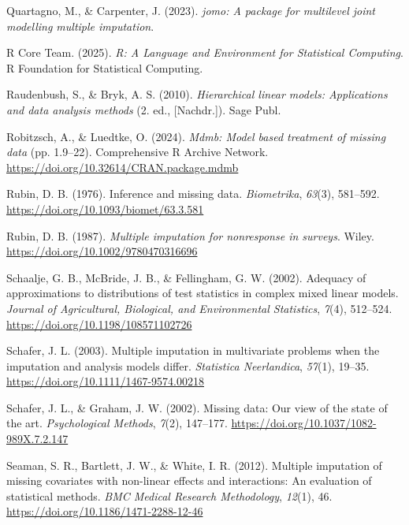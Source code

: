 \documentclass[
  letterpaper,
  11pt,
  english,
  singlespacing,
  headsepline,
  openany]{MastersDoctoralThesis}
\newlength{\cslhangindent}
\newenvironment{CSLReferences}[2] %
 {\begin{list}{}{%
  \setlength{\itemindent}{0pt}
  \setlength{\leftmargin}{0pt}
  \setlength{\parsep}{0pt}
  \ifodd #1
   \setlength{\leftmargin}{\cslhangindent}
   \setlength{\itemindent}{-1\cslhangindent}
  \fi
  \setlength{\itemsep}{#2\baselineskip}}}
 {\end{list}}
\begin{document}
\begin{CSLReferences}{1}{0}
Quartagno, M., \& Carpenter, J. (2023). \emph{{jomo}: A package for
multilevel joint modelling multiple imputation}.

R Core Team. (2025). \emph{R: {A Language} and {Environment} for
{Statistical Computing}}. R Foundation for Statistical Computing.

Raudenbush, S., \& Bryk, A. S. (2010). \emph{Hierarchical linear models:
Applications and data analysis methods} (2. ed., {[}Nachdr.{]}). Sage
Publ.

Robitzsch, A., \& Luedtke, O. (2024). \emph{Mdmb: {Model} based
treatment of missing data} (pp. 1.9--22). Comprehensive R Archive
Network. \url{https://doi.org/10.32614/CRAN.package.mdmb}

Rubin, D. B. (1976). Inference and missing data. \emph{Biometrika},
\emph{63}(3), 581--592. \url{https://doi.org/10.1093/biomet/63.3.581}

Rubin, D. B. (1987). \emph{Multiple imputation for nonresponse in
surveys}. Wiley. \url{https://doi.org/10.1002/9780470316696}

Schaalje, G. B., McBride, J. B., \& Fellingham, G. W. (2002). Adequacy
of approximations to distributions of test statistics in complex mixed
linear models. \emph{Journal of Agricultural, Biological, and
Environmental Statistics}, \emph{7}(4), 512--524.
\url{https://doi.org/10.1198/108571102726}

Schafer, J. L. (2003). Multiple imputation in multivariate problems when
the imputation and analysis models differ. \emph{Statistica
Neerlandica}, \emph{57}(1), 19--35.
\url{https://doi.org/10.1111/1467-9574.00218}

Schafer, J. L., \& Graham, J. W. (2002). Missing data: {Our} view of the
state of the art. \emph{Psychological Methods}, \emph{7}(2), 147--177.
\url{https://doi.org/10.1037/1082-989X.7.2.147}

Seaman, S. R., Bartlett, J. W., \& White, I. R. (2012). Multiple
imputation of missing covariates with non-linear effects and
interactions: An evaluation of statistical methods. \emph{BMC Medical
Research Methodology}, \emph{12}(1), 46.
\url{https://doi.org/10.1186/1471-2288-12-46}


\end{CSLReferences}
\end{document}
